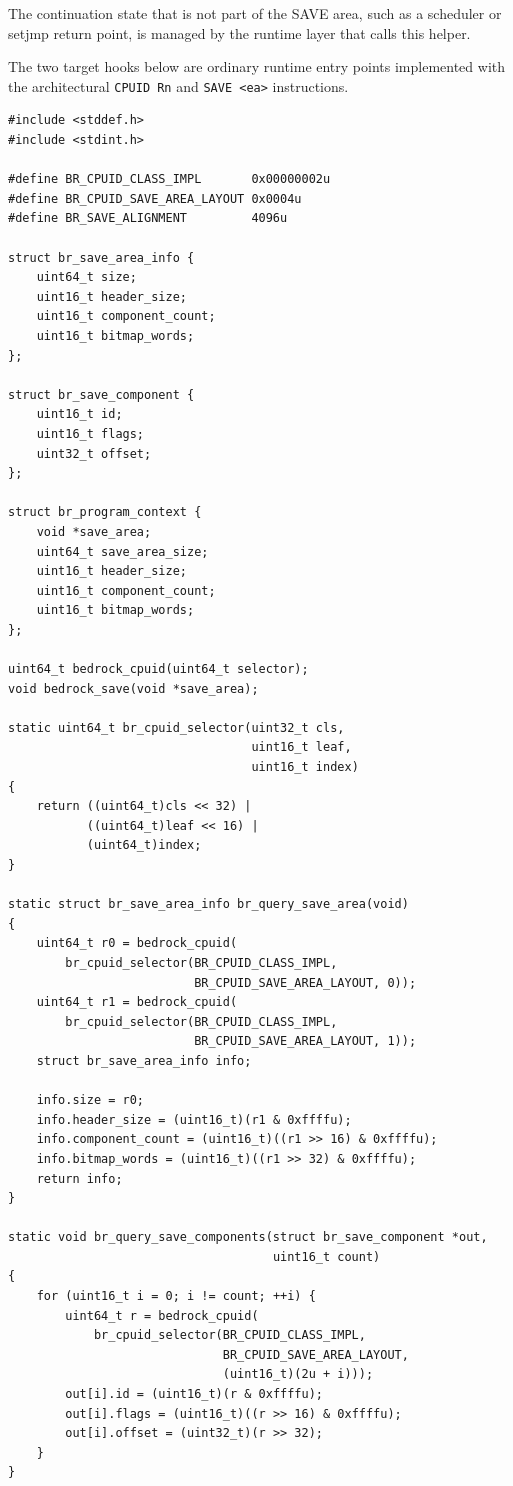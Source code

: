 The continuation state that is not part of the SAVE area, such as a scheduler or setjmp return point, is managed
by the runtime layer that calls this helper.

The two target hooks below are ordinary runtime entry points implemented with the architectural \texttt{CPUID Rn}
and \texttt{SAVE \textless{}ea\textgreater{}} instructions.

\par\begingroup\footnotesize
\begin{verbatim}
#include <stddef.h>
#include <stdint.h>

#define BR_CPUID_CLASS_IMPL       0x00000002u
#define BR_CPUID_SAVE_AREA_LAYOUT 0x0004u
#define BR_SAVE_ALIGNMENT         4096u

struct br_save_area_info {
    uint64_t size;
    uint16_t header_size;
    uint16_t component_count;
    uint16_t bitmap_words;
};

struct br_save_component {
    uint16_t id;
    uint16_t flags;
    uint32_t offset;
};

struct br_program_context {
    void *save_area;
    uint64_t save_area_size;
    uint16_t header_size;
    uint16_t component_count;
    uint16_t bitmap_words;
};

uint64_t bedrock_cpuid(uint64_t selector);
void bedrock_save(void *save_area);

static uint64_t br_cpuid_selector(uint32_t cls,
                                  uint16_t leaf,
                                  uint16_t index)
{
    return ((uint64_t)cls << 32) |
           ((uint64_t)leaf << 16) |
           (uint64_t)index;
}

static struct br_save_area_info br_query_save_area(void)
{
    uint64_t r0 = bedrock_cpuid(
        br_cpuid_selector(BR_CPUID_CLASS_IMPL,
                          BR_CPUID_SAVE_AREA_LAYOUT, 0));
    uint64_t r1 = bedrock_cpuid(
        br_cpuid_selector(BR_CPUID_CLASS_IMPL,
                          BR_CPUID_SAVE_AREA_LAYOUT, 1));
    struct br_save_area_info info;

    info.size = r0;
    info.header_size = (uint16_t)(r1 & 0xffffu);
    info.component_count = (uint16_t)((r1 >> 16) & 0xffffu);
    info.bitmap_words = (uint16_t)((r1 >> 32) & 0xffffu);
    return info;
}

static void br_query_save_components(struct br_save_component *out,
                                     uint16_t count)
{
    for (uint16_t i = 0; i != count; ++i) {
        uint64_t r = bedrock_cpuid(
            br_cpuid_selector(BR_CPUID_CLASS_IMPL,
                              BR_CPUID_SAVE_AREA_LAYOUT,
                              (uint16_t)(2u + i)));
        out[i].id = (uint16_t)(r & 0xffffu);
        out[i].flags = (uint16_t)((r >> 16) & 0xffffu);
        out[i].offset = (uint32_t)(r >> 32);
    }
}


\end{verbatim}
